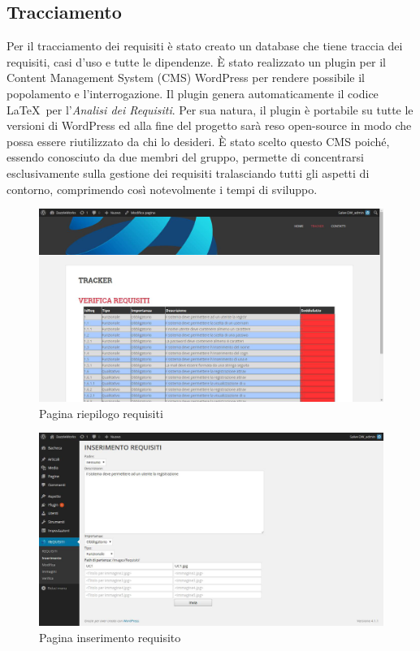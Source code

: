 \subsection{Tracciamento}
Per il tracciamento dei requisiti è stato creato un database che tiene traccia dei requisiti, casi d'uso e tutte le dipendenze.
È stato realizzato un plugin per il Content Management System (CMS) WordPress per rendere possibile il popolamento e l'interrogazione.
Il plugin genera automaticamente il codice \LaTeX\ per l'\textit{Analisi dei Requisiti}.
Per sua natura, il plugin è portabile su tutte le versioni di WordPress ed alla fine del progetto sarà reso open-source in modo che possa essere riutilizzato da chi lo desideri. È stato scelto questo CMS poiché, essendo conosciuto da due membri del gruppo, permette di concentrarsi esclusivamente sulla gestione dei requisiti tralasciando tutti gli aspetti di contorno, comprimendo così notevolmente i tempi di sviluppo.
\begin{figure}[h]
\centering
\includegraphics[width=0.7\linewidth]{img/tracker1}
\caption[Pagina riepilogo requisiti]{Pagina riepilogo requisiti}
\label{fig:tracker1}
\end{figure}
\begin{figure}[h]
\centering
\includegraphics[width=0.7\linewidth]{img/tracker2}
\caption[Pagina inserimento requisito]{Pagina inserimento requisito}
\label{fig:tracker2}
\end{figure}

